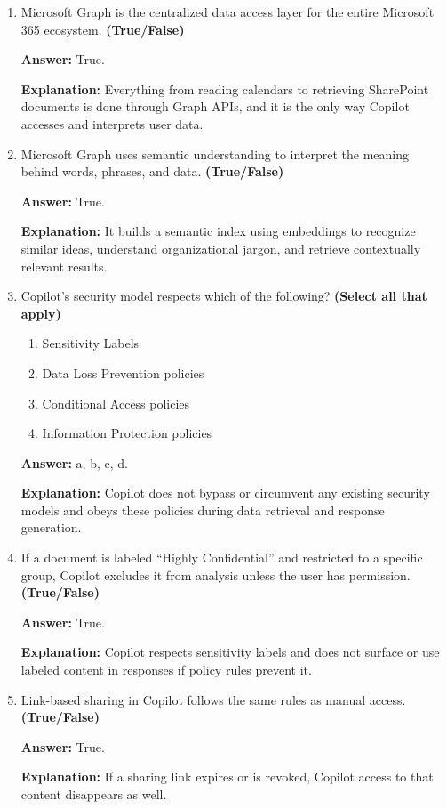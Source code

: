 \documentclass[10pt]{article}
\begin{document}
\begin{enumerate}[leftmargin=*]
\item Microsoft Graph is the centralized data access layer for the entire Microsoft 365 ecosystem. \textbf{(True/False)}

\textbf{Answer:} True.

\textbf{Explanation:} Everything from reading calendars to retrieving SharePoint documents is done through Graph APIs, and it is the only way Copilot accesses and interprets user data.

\item Microsoft Graph uses semantic understanding to interpret the meaning behind words, phrases, and data. \textbf{(True/False)}

\textbf{Answer:} True.

\textbf{Explanation:} It builds a semantic index using embeddings to recognize similar ideas, understand organizational jargon, and retrieve contextually relevant results.

\item Copilot’s security model respects which of the following? \textbf{(Select all that apply)}
\begin{enumerate}[label=\alph*., leftmargin=1.5em]
\item Sensitivity Labels
\item Data Loss Prevention policies
\item Conditional Access policies
\item Information Protection policies
\end{enumerate}
\textbf{Answer:} a, b, c, d.

\textbf{Explanation:} Copilot does not bypass or circumvent any existing security models and obeys these policies during data retrieval and response generation.

\item If a document is labeled “Highly Confidential” and restricted to a specific group, Copilot excludes it from analysis unless the user has permission. \textbf{(True/False)}

\textbf{Answer:} True.

\textbf{Explanation:} Copilot respects sensitivity labels and does not surface or use labeled content in responses if policy rules prevent it.

\item Link-based sharing in Copilot follows the same rules as manual access. \textbf{(True/False)}

\textbf{Answer:} True.

\textbf{Explanation:} If a sharing link expires or is revoked, Copilot access to that content disappears as well.


\end{enumerate}
\end{document}
